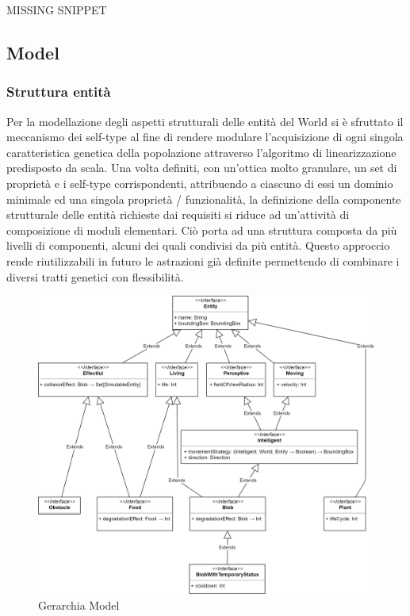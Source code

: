 MISSING SNIPPET

\subsection{Model}

\subsubsection{Struttura entità}
Per la modellazione degli aspetti strutturali delle entità del World si è sfruttato il meccanismo dei self-type al fine di rendere modulare l’acquisizione di ogni singola caratteristica genetica della popolazione attraverso l’algoritmo di linearizzazione predisposto da scala. Una volta definiti, con un’ottica molto granulare, un set di proprietà e i self-type corrispondenti, attribuendo a ciascuno di essi un dominio minimale ed una singola proprietà / funzionalità, la definizione della componente strutturale delle entità richieste dai requisiti si riduce ad un’attività di composizione di moduli elementari. Ciò porta ad una struttura composta da più livelli di componenti, alcuni dei quali condivisi da più entità. Questo approccio rende riutilizzabili in futuro le astrazioni già definite permettendo di combinare i diversi tratti genetici con flessibilità.

\begin{figure}[h!]
\centering
\includegraphics[width=\textwidth, scale=0.44]{img/ModelHierarchy.png}
\caption{Gerarchia Model}
\label{fig:modelhierarchy3}
\end{figure}

